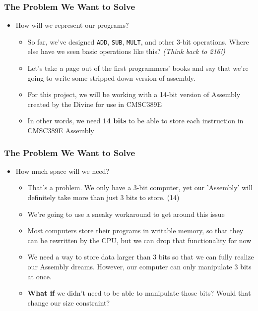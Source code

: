 \documentclass{beamer}
\begin{document}
    		
    		\begin{frame}
    			\frametitle{The Problem We Want to Solve}
    			\begin{itemize}
    				\item How will we represent our programs?
    				\begin{itemize}
    					\item So far, we've designed \texttt{ADD}, \texttt{SUB}, \texttt{MULT}, and other 3-bit operations. Where else have we seen basic operations like this? \textit{(Think back to 216!)}
    					\item Let's take a page out of the first programmers' books and say that we're going to write some stripped down version of assembly.
    					\item For this project, we will be working with a 14-bit version of Assembly created by the Divine for use in CMSC389E
    					\item In other words, we need \textbf{14 bits} to be able to store each instruction in CMSC389E Assembly
    				\end{itemize}
    			\end{itemize}
    		\end{frame}
    		
    		\begin{frame}
    			\frametitle{The Problem We Want to Solve}
    			\begin{itemize}
    				\item How much space will we need?
    				\begin{itemize}
    					\item That's a problem. We only have a 3-bit computer, yet our 'Assembly' will definitely take more than just 3 bits to store. (14)
    					\item We're going to use a sneaky workaround to get around this issue
    					\item Most computers store their programs in writable memory, so that they can be rewritten by the CPU, but we can drop that functionality for now
    					\item We need a way to store data larger than 3 bits so that we can fully realize our Assembly dreams. However, our computer can only manipulate 3 bits at once.
    					\item \textbf{What if} we didn't need to be able to manipulate those bits? Would that change our size constraint?
    				\end{itemize}
    			\end{itemize}
    		\end{frame}
    
\end{document}

